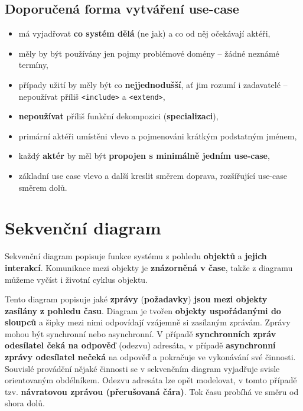 \subsection{Doporučená forma vytváření use-case}
\begin{itemize}
    \item má vyjadřovat \textbf{co systém dělá} (ne jak) a co od něj očekávají aktéři,
    \item měly by být používány jen pojmy problémové domény -- žádné neznámé termíny,
    \item případy užití by měly být co \textbf{nejjednodušší}, ať jim rozumí i zadavatelé -- nepoužívat příliš \texttt{<include>} a \texttt{<extend>},
    \item \textbf{nepoužívat} příliš funkční dekompozici (\textbf{specializaci}),
    \item primární aktéři umístěni vlevo a pojmenováni krátkým podstatným jménem,
    \item každý \textbf{aktér} by měl být \textbf{propojen s minimálně jedním use-case},
    \item základní use case vlevo a další kreslit směrem doprava, rozšířující use-case směrem dolů.
\end{itemize}

\section{Sekvenční diagram}
Sekvenční diagram popisuje funkce systému z pohledu \textbf{objektů} a\textbf{ jejich interakcí}. Komunikace mezi objekty je \textbf{znázorněná v čase}, takže z diagramu můžeme vyčíst i životní cyklus objektu.

Tento diagram popisuje jaké \textbf{zprávy} (\textbf{požadavky}) \textbf{jsou mezi objekty zasílány} \textbf{z pohledu času}. Diagram je tvořen \textbf{objekty uspořádanými do sloupců} a šipky mezi nimi odpovídají {vzájemně si zasílaným zprávám}. Zprávy mohou být {synchronní} nebo {asynchronní}. V případě \textbf{synchronních zpráv odesílatel čeká na odpověď} (odezvu) adresáta, v případě \textbf{asynchronní zprávy odesílatel nečeká} na odpověď a pokračuje ve vykonávání své činnosti. Souvislé provádění nějaké činnosti se v sekvenčním diagram vyjadřuje svisle orientovaným obdélníkem. Odezvu adresáta lze opět modelovat, v tomto případě tzv. \textbf{návratovou zprávou (přerušovaná čára)}. Tok času probíhá ve směru od shora dolů.
\\\\
\noindent{}

